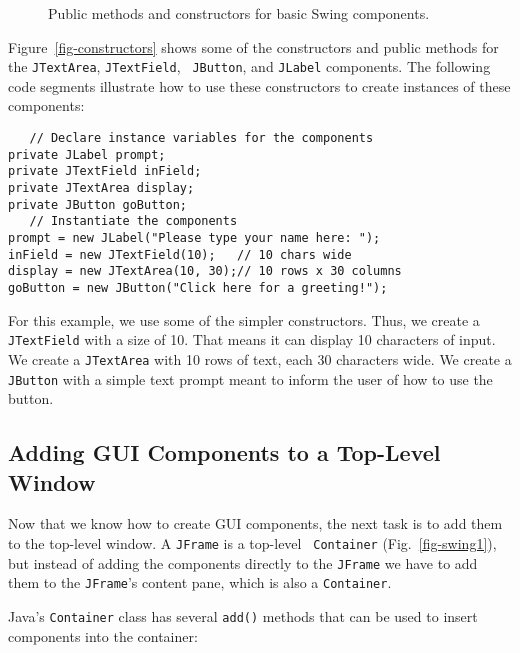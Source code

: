 \begin{figure}[tb]
{Public methods and constructors for basic Swing components.
\label{fig-constructors}
\label{pg-fig-constructors}}
\end{figure}

Figure~\ref{fig-constructors} shows some of the constructors and
public methods for the {\tt JTextArea}, {\tt JTextField}, {\tt
JButton}, and {\tt JLabel} components. The following code segments
illustrate how to use these constructors to create instances of these
components:

\begin{jjjlisting}
\begin{lstlisting}
   // Declare instance variables for the components
private JLabel prompt;
private JTextField inField;
private JTextArea display;
private JButton goButton;
   // Instantiate the components
prompt = new JLabel("Please type your name here: ");
inField = new JTextField(10);   // 10 chars wide
display = new JTextArea(10, 30);// 10 rows x 30 columns
goButton = new JButton("Click here for a greeting!");
\end{lstlisting}
\end{jjjlisting}

\noindent
For this example, we use some of the simpler constructors. Thus, we
create a {\tt JTextField} with a size of 10. That means it can display
10 characters of input.  We create a {\tt JTextArea} with 10 rows of
text, each 30 characters wide. We create a {\tt JButton} with a simple
text prompt meant to inform the user of how to use the button.

\subsection{Adding GUI Components to a Top-Level Window}

Now that we know how to create GUI components, the next task is to add
them to the top-level window.  A {\tt JFrame} is a top-level {\tt
Container} (Fig.~\ref{fig-swing1}), but instead of adding the
components directly to the {\tt JFrame} we have to add them to the
{\tt JFrame}'s content pane, which is also a {\tt Container}.


\noindent Java's {\tt Container} class has several {\tt add()} methods that 
can be used to insert components into the container:

